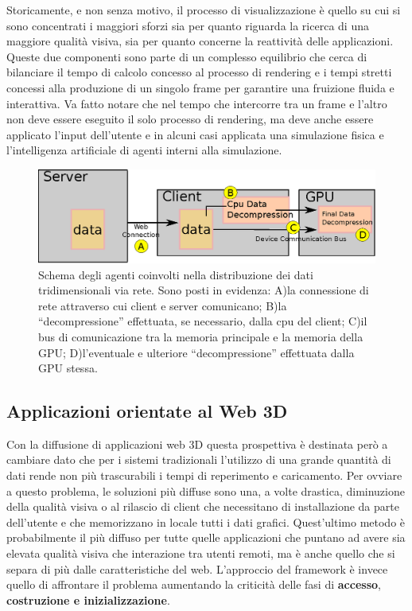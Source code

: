 Storicamente, e non senza motivo, il processo di visualizzazione \`e quello su cui si sono concentrati i maggiori sforzi sia per quanto riguarda la ricerca di una maggiore qualit\`a visiva, sia per quanto concerne la reattivit\`a delle applicazioni. Queste due componenti sono parte di un complesso equilibrio che cerca di bilanciare il tempo di calcolo concesso al processo di rendering e i tempi stretti concessi alla produzione di un singolo frame per garantire una fruizione fluida e interattiva. Va fatto notare che nel tempo che intercorre tra un frame e l'altro non deve essere eseguito il solo processo di rendering, ma deve anche essere applicato l'input dell'utente e in alcuni casi applicata una simulazione fisica e l'intelligenza artificiale di agenti interni alla simulazione.

\begin{figure}
\begin{center}
\includegraphics[width=\textwidth]{Immagini/genericdecompressionpipeline}
\caption[Schema agenti della distribuzione dei dati]{Schema degli agenti coinvolti nella distribuzione dei dati tridimensionali via rete. Sono posti in evidenza: A)la connessione di rete attraverso cui client e server comunicano; B)la ``decompressione'' effettuata, se necessario, dalla cpu del client; C)il bus di comunicazione tra la memoria principale e la memoria della GPU; D)l'eventuale e ulteriore ``decompressione'' effettuata dalla GPU stessa.\label{f:genericdecompressionpipeline}} 
\end{center} 
\end{figure}

\subsection{Applicazioni orientate al Web 3D}
Con la diffusione di applicazioni web 3D questa prospettiva \`e destinata per\`o a cambiare dato che per i sistemi tradizionali l'utilizzo di una grande quantit\`a di dati rende non pi\`u trascurabili i tempi di reperimento e caricamento. 
Per ovviare a questo problema, le soluzioni pi\`u diffuse sono una, a volte drastica, diminuzione della qualit\`a visiva o al rilascio di client che necessitano di installazione da parte dell'utente e che memorizzano in locale tutti i dati grafici. Quest'ultimo metodo \`e probabilmente il pi\`u diffuso per tutte quelle applicazioni che puntano ad avere sia elevata qualit\`a visiva che interazione tra utenti remoti, ma \`e anche quello che si separa di pi\`u dalle caratteristiche del web.
L'approccio del framework \`e invece quello di affrontare il problema aumentando la criticit\`a delle fasi di \textbf{accesso}, \textbf{costruzione e inizializzazione}.

